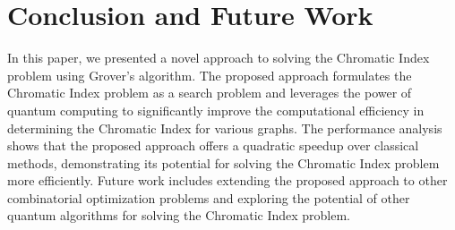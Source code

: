 \section{Conclusion and Future Work}

In this paper, we presented a novel approach to solving the Chromatic Index problem using Grover's algorithm. The proposed approach formulates the Chromatic Index problem as a search problem and leverages the power of quantum computing to significantly improve the computational efficiency in determining the Chromatic Index for various graphs. The performance analysis shows that the proposed approach offers a quadratic speedup over classical methods, demonstrating its potential for solving the Chromatic Index problem more efficiently. Future work includes extending the proposed approach to other combinatorial optimization problems and exploring the potential of other quantum algorithms for solving the Chromatic Index problem.

